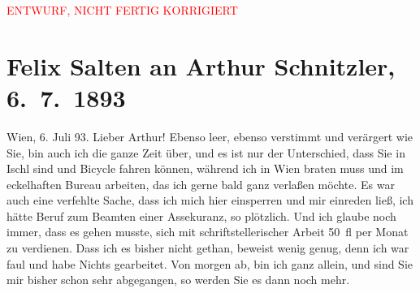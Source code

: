 
\begin{center}
            \textcolor{red}{ENTWURF, NICHT FERTIG KORRIGIERT}
                      \end{center}
            
         
         \renewcommand{\erwaehntePersonen}{Personen: Richard Beer-Hofmann, Hugo von Hofmannsthal, Paul Horn, Karl Peter Rosner, Richard Specht, Ignaz Wild}
         \renewcommand{\erwaehnteInstitutionen}{Institutionen: Saisontheater Ischl}
         \renewcommand{\erwaehnteOrte}{Orte: Bad Aussee, Bad Ischl, Rohrerhütte, Wien}
         \renewcommand{\erwaehnteWerke}{Werke: Abschiedssouper, Begräbnis, Das Märchen. Schauspiel in drei Aufzügen, Décadence. Novelletten, Psychopathia sexualis, Straßenliebe}
               \section[Felix Salten an Arthur Schnitzler, 6. 7. 1893]{ Felix Salten an Arthur Schnitzler, 6. 7. 1893}\nopagebreak{}\rehead{ }\begin{ledgroupsized}[t]{13cm}\normalsize\beginnumbering \toendnotes[C]{\smallbreak\pagebreak[2]} 
\toendnotes[C]{\smallbreak}\pstart
           {\pb}Wien, 6. Juli 93.\pend
           \pstart
           Lieber Arthur! Ebenso leer, ebenso verstimmt und verärgert wie Sie,
               bin auch ich die ganze Zeit über, und es ist nur der Unterschied, dass Sie in Ischl sind und Bicycle fahren können, während ich
               in Wien braten muss und im eckelhaften Bureau
               arbeiten, das ich gerne bald ganz verlaßen möchte. Es war auch eine verfehlte Sache,
               dass ich mich hier einsperren und mir einreden ließ, ich hätte Beruf zum Beamten
               einer Assekuranz, so plötzlich. Und ich glaube noch immer, dass es gehen musste, sich
               mit schriftstellerischer {\pb}Arbeit
               50 fl per Monat zu verdienen. Dass ich es bisher nicht gethan, beweist wenig genug,
               denn ich war faul und habe Nichts gearbeitet. Von morgen ab, bin ich ganz allein, und
               sind Sie mir bisher schon sehr abgegangen, so werden Sie es dann noch mehr. \pend

\end{ledgroupsized}
